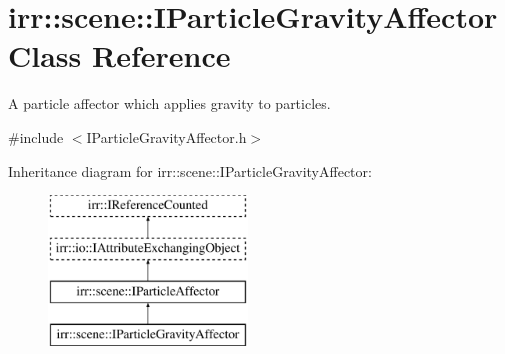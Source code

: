 \hypertarget{classirr_1_1scene_1_1IParticleGravityAffector}{}\section{irr\+:\+:scene\+:\+:I\+Particle\+Gravity\+Affector Class Reference}
\label{classirr_1_1scene_1_1IParticleGravityAffector}


A particle affector which applies gravity to particles.  




{\ttfamily \#include $<$I\+Particle\+Gravity\+Affector.\+h$>$}

Inheritance diagram for irr\+:\+:scene\+:\+:I\+Particle\+Gravity\+Affector\+:\begin{figure}[H]
\begin{center}
\leavevmode
\includegraphics[height=4.000000cm]{classirr_1_1scene_1_1IParticleGravityAffector}
\end{center}
\end{figure}
